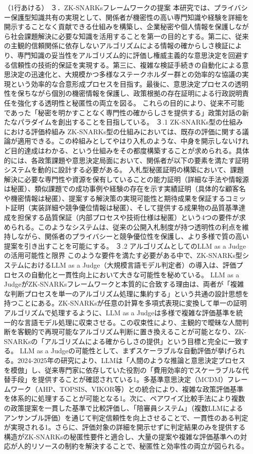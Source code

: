 （1行あける） ３．ZK-SNARKsフレームワークの提案
本研究では、プライバシー保護型知識共有の実現として、関係者が機密性の高い専門知識や経験を詳細を開示することなく貢献できる仕組みを構築し、企業秘密や個人情報を保護しながら社会課題解決に必要な知識を活用することを第一の目的とする。第二に、従来の主観的信頼関係に依存しないアルゴリズムによる情報の確からしさ検証により、専門知識の妥当性をアルゴリズム的に評価し権威主義的な意思決定を回避する信頼性の技術的保証を実現する。第三に、複雑な検証手続きの自動化による意思決定の迅速化と、大規模かつ多様なステークホルダー群との効率的な協議の実現という効率的な合意形成プロセスを目指す。最後に、意思決定プロセスの透明性を保ちながら個別の機密情報を保護し、政策根拠の存在証明による行政説明責任を強化する透明性と秘匿性の両立を図る。
これらの目的により、従来不可能であった「秘密を明かすことなく専門性の確からしさを提供する」政策対話の新たなパラダイムを創出することを目指している。
３.1 ZK-SNARKs型の仕組みにおける評価枠組み
ZK-SNARKs型の仕組みにおいては、既存の評価に関する議論が適用できる。この枠組みとしてやはり入札のような、中身を開示しないけれど目的達成はわかる、という仕組みをその都度構築することが求められる。具体的には、各政策課題や意思決定局面において、関係者が以下の要素を満たす証明システムを動的に設計する必要がある。
入札型秘匿証明の構築において、課題解決に必要な専門性や資源を保有していることの能力証明（詳細な手法や情報源は秘匿）、類似課題での成功事例や経験の存在を示す実績証明（具体的な顧客名や機密情報は秘匿）、提案する解決策の実現可能性と期待成果を保証するコミット証明（実装詳細や競争優位情報は秘匿）、そして提供する成果物の品質基準達成を担保する品質保証（内部プロセスや技術仕様は秘匿）という4つの要件が求められる。このようなシステムは、従来の公開入札制度が持つ透明性の利点を維持しながら、関係者のプライバシーと競争優位性を保護し、より多様で質の高い提案を引き出すことを可能にする。
３.2 アルゴリズムとしてのLLM as a Judgeの活用可能性と限界
このような要件を満たす必要がある中で、ZK-SNARKs型システムにおけるLLM as
a
Judge（大規模言語モデル判定者）の導入は、評価プロセスの自動化と一貫性向上において大きな可能性を秘めている。
LLM as a
JudgeがZK-SNARKsフレームワークと本質的に合致する理由は、両者が「複雑な判断プロセスを単一のアルゴリズム処理に集約する」という共通の設計思想を持つことにある。ZK-SNARKsが任意の計算を多項式表現に変換して単一の証明アルゴリズムで処理するように、LLM
as a
Judgeは多様で複雑な評価基準を統一的な言語モデル処理に収束させる。この収束性により、主観的で曖昧な人間判断を客観的で再現可能なアルゴリズム判断に置き換えることが可能となり、ZK-SNARKsの「アルゴリズムによる確からしさの提供」という目標と完全に一致する。
LLM as a
Judgeの可能性として、まずスケーラブルな自動評価が挙げられる。2024-2025年の研究により、LLMは「人間のような推論と意思決定プロセスを模倣」し、従来専門家に依存していた役割の「費用効率的でスケーラブルな代替手段」を提供することが確認されている1。多基準意思決定（MCDM）フレームワーク（AHP、TOPSIS、VIKOR等）との統合により、複雑な政策評価基準を体系的に処理することが可能となる1。次に、ペアワイズ比較手法により複数の政策提案を一貫した基準で比較評価し、「陪審員システム」（複数LLMによるアンサンブル評価）を通じて判定信頼性を向上させることで、一貫性のある判定が実現される1。さらに、評価対象の詳細を開示せずに判定結果のみを提供する構造がZK-SNARKsの秘匿性要件と適合し、大量の提案や複雑な評価基準への対応が人的リソースの制約を解決することで、秘匿性と効率性の両立が図られる。
